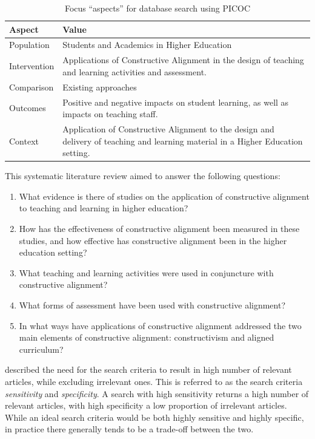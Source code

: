 \begin{table}[t]
	\renewcommand{\arraystretch}{1.2}
	\centering
	\caption{Focus ``aspects'' for database search using PICOC}
	\label{tbl:picoc}

    \begin{tabular}{l|p{9cm}}
    \textbf{Aspect} & \textbf{Value} \\
    \hline
    Population & Students and Academics in Higher Education\\
    Intervention & Applications of Constructive Alignment in the design of teaching and learning activities and assessment. \\
    Comparison & Existing approaches \\
    Outcomes & Positive and negative impacts on student learning, as well as impacts on teaching staff. \\
    Context & Application of Constructive Alignment to the design and delivery of teaching and learning material in a Higher Education setting. \\
    \end{tabular}
\end{table}


This systematic literature review aimed to answer the following questions:

\begin{enumerate}
	\item What evidence is there of studies on the application of constructive alignment to teaching and learning in higher education?
	\item How has the effectiveness of constructive alignment been measured in these studies, and how effective has constructive alignment been in the higher education setting?
	\item What teaching and learning activities were used in conjuncture with constructive alignment?
	\item What forms of assessment have been used with constructive alignment?
	\item In what ways have applications of constructive alignment addressed the two main elements of constructive alignment: constructivism and aligned curriculum?
\end{enumerate}

\citet{Petticrew:2008} described the need for the search criteria to result in high number of relevant articles, while excluding irrelevant ones. This is referred to as the search criteria \emph{sensitivity} and \emph{specificity}. A search with high sensitivity returns a high number of relevant articles, with high specificity a low proportion of irrelevant articles. While an ideal search criteria would be both highly sensitive and highly specific, in practice there generally tends to be a trade-off between the two. 

